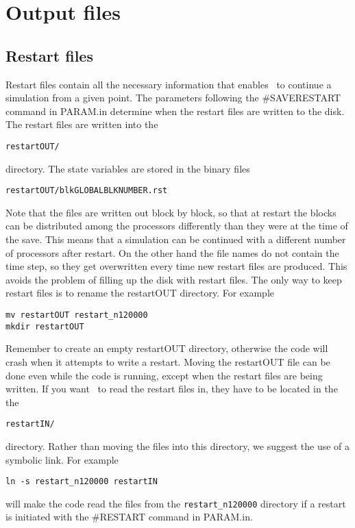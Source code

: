 \chapter{Output files \label{chapter:output}}

\section{Restart files \label{section:restart_output}}

Restart files contain all the necessary information that enables \BATSRUS\ 
to continue a simulation from a given point. The parameters following
the \#SAVERESTART command in PARAM.in determine when the restart files 
are written to the disk. The restart files are written into the 
\begin{verbatim}
restartOUT/
\end{verbatim}
directory. The state variables are stored in the binary files
\begin{verbatim}
restartOUT/blkGLOBALBLKNUMBER.rst
\end{verbatim}
Note that the files are written out block by block, so that
at restart the blocks can be distributed among the processors differently
than they were at the time of the save. This means that a simulation
can be continued with a different number of processors after restart.
On the other hand the file names do not contain the time step, so they
get overwritten every time new restart files are produced. This avoids
the problem of filling up the disk with restart files. The only way to
keep restart files is to rename the restartOUT directory. For example
\begin{verbatim}
mv restartOUT restart_n120000
mkdir restartOUT
\end{verbatim}
Remember to create an empty restartOUT directory, otherwise the code will
crash when it attempts to write a restart. Moving the restartOUT file
can be done even while the code is running, except when the restart
files are being written. If you want \BATSRUS\ to read the restart files in,
they have to be located in the the 
\begin{verbatim}
restartIN/
\end{verbatim}
directory. Rather than moving the files into this directory, we suggest
the use of a symbolic link. For example
\begin{verbatim}
ln -s restart_n120000 restartIN
\end{verbatim}
will make the code read the files from the {\tt restart\_n120000} directory
if a restart is initiated with the \#RESTART command in PARAM.in.

